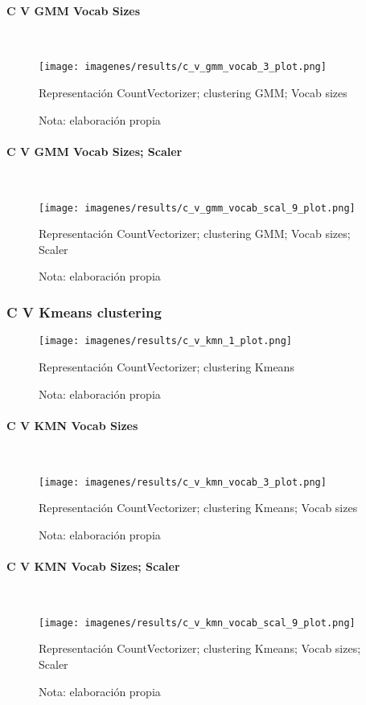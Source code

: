 \documentclass[12pt]{article}
\newcommand{\subsubsubsection}[1]{\paragraph{#1}\mbox{}\\}
\begin{document}
				\subsubsubsection{C V GMM Vocab Sizes}
				\begin{figure}[H]
					\texttt{[image: imagenes/results/c\_v\_gmm\_vocab\_3\_plot.png]}
					\centering
					\caption{Representación CountVectorizer; clustering GMM; Vocab sizes}
					\caption*{\small Nota:  elaboración propia}
					\label{fig:cv_gmm_vocab_3}
				\end{figure}
							
				\subsubsubsection{C V GMM Vocab Sizes; Scaler}
				\begin{figure}[H]
					\texttt{[image: imagenes/results/c\_v\_gmm\_vocab\_scal\_9\_plot.png]}
					\centering
					\caption{Representación CountVectorizer; clustering GMM; Vocab sizes; Scaler}
					\caption*{\small Nota:  elaboración propia}
					\label{fig:cv_gmm_vocab_scal_9}
				\end{figure}
				
			\subsubsection{C V Kmeans clustering}
			\begin{figure}[H]
				\texttt{[image: imagenes/results/c\_v\_kmn\_1\_plot.png]}
				\centering
				\caption{Representación CountVectorizer; clustering Kmeans}
				\caption*{\small Nota:  elaboración propia}
				\label{fig:cv_kmn_1}
			\end{figure}
			
				\subsubsubsection{C V KMN Vocab Sizes}
				\begin{figure}[H]
					\texttt{[image: imagenes/results/c\_v\_kmn\_vocab\_3\_plot.png]}
					\centering
					\caption{Representación CountVectorizer; clustering Kmeans; Vocab sizes}
					\caption*{\small Nota:  elaboración propia}
					\label{fig:cv_kmn_vocab_3}
				\end{figure}
							
				\subsubsubsection{C V KMN Vocab Sizes; Scaler}
				\begin{figure}[H]
					\texttt{[image: imagenes/results/c\_v\_kmn\_vocab\_scal\_9\_plot.png]}
					\centering
					\caption{Representación CountVectorizer; clustering Kmeans; Vocab sizes; Scaler}
					\caption*{\small Nota:  elaboración propia}
					\label{fig:cv_kmn_vocab_scal_9}
				\end{figure}
						
\end{document}
